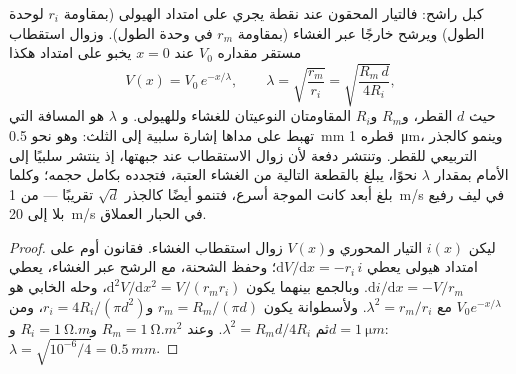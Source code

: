 \begin{theorem}\label{thm:b2:neurons-synapses:cable}
 كبل راشح: فالتيار المحقون عند نقطة يجري على امتداد
الهيولى (بمقاومة $r_i$ لوحدة الطول) ويرشح خارجًا
عبر الغشاء (بمقاومة $r_m$ في وحدة الطول). وزوال استقطاب
مستقر مقداره $V_0$ عند $x = 0$ يخبو على امتداد  هكذا
\[
V(x) = V_0\,e^{-x/\lambda}, \qquad \lambda = \sqrt{\frac{r_m}{r_i}} = \sqrt{\frac{R_m\,d}{4R_i}},
\]
حيث $d$ القطر، و$R_m$ و$R_i$ المقاومتان النوعيتان للغشاء
وللهيولى. و\emph{}
$\lambda$ هو المسافة التي تهبط على مداها إشارة سلبية إلى
الثلث: وهو نحو \qty{0.5}{mm}  قطره \qty{1}{\micro m}، وينمو
كالجذر التربيعي للقطر. وتنتشر دفعة 
لأن زوال الاستقطاب عند جبهتها، إذ ينتشر سلبيًا إلى الأمام
بمقدار $\lambda$ نحوًا، يبلغ بالقطعة التالية من الغشاء
العتبة، فتجدده بكامل حجمه؛ وكلما بلغ أبعد
كانت الموجة أسرع، فتنمو  أيضًا
كالجذر $\sqrt{d}$ تقريبًا --- من \qty{1}{m/s} في ليف رفيع
بلا  إلى \qty{20}{m/s} في  الحبار العملاق.
\end{theorem}
\begin{proof}
ليكن $i(x)$ التيار المحوري و$V(x)$ زوال استقطاب
الغشاء. فقانون أوم على امتداد هيولى  يعطي $\mathrm{d}V/
\mathrm{d}x = -r_i\,i$؛ وحفظ الشحنة، مع الرشح عبر
الغشاء، يعطي $\mathrm{d}i/\mathrm{d}x = -V/r_m$. وبالجمع بينهما
يكون $\mathrm{d}^{2}V/\mathrm{d}x^{2} = V/(r_m r_i)$، وحله
الخابي هو $V_0 e^{-x/\lambda}$ مع $\lambda^{2} = r_m/r_i$. ولأسطوانة
يكون $r_m = R_m/(\pi d)$ و$r_i = 4R_i/(\pi d^{2})$، ومن ثم
$\lambda^{2} = R_m d/4R_i$. وعند $R_m = \qty{1}{\ohm.m^2}$ و$R_i =
\qty{1}{\ohm.m}$ و$d = \qty{1}{\micro m}$: $\lambda = \sqrt{10^{-6}
/4} = \qty{0.5}{mm}$.
\end{proof}

